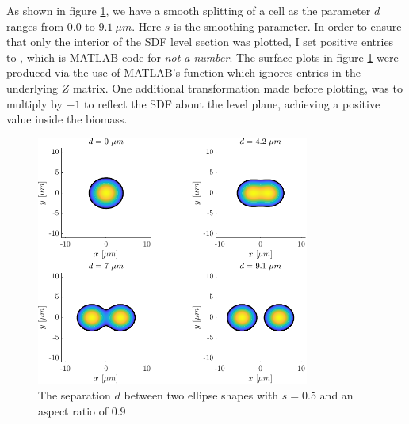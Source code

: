 As shown in figure \ref{fig:mitosisplot}, we have a smooth splitting of a 
cell as the parameter $d$ ranges from $0.0$ to $9.1 \ \mu m$. Here $s$ is the 
smoothing parameter. In order to ensure that only the interior
of the SDF level section was plotted, I set positive entries to ,
which is MATLAB code for \textit{not a number}. The surface plots in figure \ref{fig:mitosisplot}
were produced via the use of MATLAB's  function which ignores  entries
in the underlying $Z$ matrix. One additional transformation made before plotting, was to multiply by 
$-1$ to reflect the SDF about the level plane, achieving a positive value inside the biomass.
\begin{figure}[!htb]
    \centering
    \includegraphics[width=0.8\textwidth]{chapter1/figures/mitosisPlot.pdf}
    \caption{The separation $d$ between two ellipse shapes with $s = 0.5$ and 
    an aspect ratio of $0.9$}
    \label{fig:mitosisplot}
\end{figure}
\\

